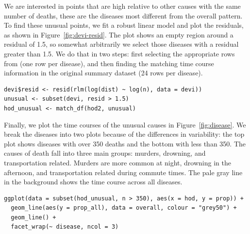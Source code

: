 \documentclass[article]{jss}
\begin{document}
We are interested in points that are high relative to other causes with the same number of deaths, these are the diseases most different from the overall pattern. To find these unusual points, we fit a robust linear model and plot the residuals, as shown in Figure~\ref{fig:devi-resid}. The plot shows an empty region around a residual of 1.5, so somewhat arbitrarily we select those diseases with a residual greater than 1.5. We do that in two steps: first selecting the appropriate rows from  (one row per disease), and then finding the matching time course information in the original summary dataset (24 rows per disease).

\begin{Verbatim}
devi$resid <- resid(rlm(log(dist) ~ log(n), data = devi))
unusual <- subset(devi, resid > 1.5)
hod_unusual <- match_df(hod2, unusual)
\end{Verbatim}

Finally, we plot the time courses of the unusual causes in Figure~\ref{fig:disease}. We break the diseases into two plots because of the differences in variability: the top plot shows diseases with over 350 deaths and the bottom with less than 350. The causes of death fall into three main groups: murders, drowning, and transportation related. Murders are more common at night, drowning in the afternoon, and transportation related during commute times. The pale gray line in the background shows the time course across all diseases.

\begin{Verbatim}
ggplot(data = subset(hod_unusual, n > 350), aes(x = hod, y = prop)) + 
  geom_line(aes(y = prop_all), data = overall, colour = "grey50") +
  geom_line() + 
  facet_wrap(~ disease, ncol = 3)
\end{Verbatim}
\end{document}
